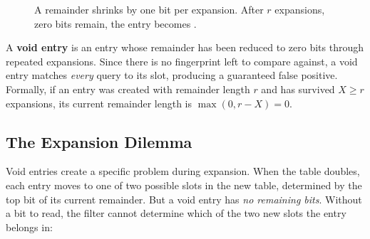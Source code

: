 \begin{figure}[H]
  \caption{A remainder shrinks by one bit per expansion. After $r$ 
           expansions, zero bits remain, the entry becomes \void{}.}
  \label{fig:void-formation}
\end{figure}

\begin{definitionbox}
A \textbf{void entry} is an entry whose remainder has been reduced to 
zero bits through repeated expansions. Since there is no fingerprint 
left to compare against, a void entry matches \emph{every} query to 
its slot, producing a guaranteed false positive. Formally, if an entry 
was created with remainder length $r$ and has survived $X \geq r$ 
expansions, its current remainder length is $\max(0, r - X) = 0$.
\end{definitionbox}

\subsection{The Expansion Dilemma}

Void entries create a specific problem during expansion. When the table 
doubles, each entry moves to one of two possible slots in the new table, determined by the top bit of its current remainder. But a void entry 
has \emph{no remaining bits}. Without a bit to read, the filter cannot 
determine which of the two new slots the entry belongs in:

